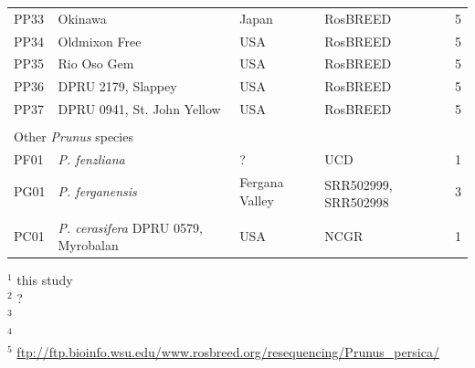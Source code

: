 \documentclass[12pt]{article}
\begin{document}
\begin{center}
\begin{longtable}{lllll}
                 PP33 &Okinawa &Japan &RosBREED &5\\
                 PP34 &Oldmixon Free &USA &RosBREED &5\\
                 PP35 &Rio Oso Gem &USA &RosBREED &5\\
                 PP36 &DPRU 2179, Slappey &USA &RosBREED &5\\
                 PP37 &DPRU 0941, St. John Yellow &USA &RosBREED &5\\
		\\
                 \multicolumn{5}{l}{Other \emph{Prunus} species}  \\
                 PF01 &\emph{P. fenzliana} &? &UCD &1\\
                 PG01 &\emph{P. ferganensis} &Fergana Valley &
		\multirow{2}{1cm}{SRR502999, SRR502998} &3\\
                 \\
                 PC01 &\emph{P. cerasifera} DPRU 0579, Myrobalan &USA &NCGR &1\\ \hline

\end{longtable}
\end{center}
$^{1}$ this study\\
$^{2}$ \citealt{koepke2013comparative}?\\
$^{3}$ \citealt{verde2013high}\\
$^{4}$ \citealt{ahmad2011whole}\\
$^{5}$ \url{ftp://ftp.bioinfo.wsu.edu/www.rosbreed.org/resequencing/Prunus_persica/}\\
\endsupplement
\end{document}

